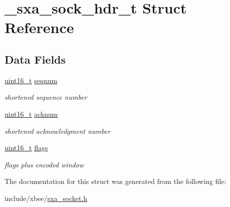 \hypertarget{struct__sxa__sock__hdr__t}{\section{\-\_\-sxa\-\_\-sock\-\_\-hdr\-\_\-t Struct Reference}
\label{struct__sxa__sock__hdr__t}
}
\subsection*{Data Fields}
\begin{DoxyCompactItemize}
\item 
\hypertarget{struct__sxa__sock__hdr__t_a90ee27660869628b83fe9e5fdeaae7b2}{\hyperlink{group__hal_ga5a8b2dc9e45a9ee81a94ef304fb62505}{uint16\-\_\-t} \hyperlink{struct__sxa__sock__hdr__t_a90ee27660869628b83fe9e5fdeaae7b2}{seqnum}}\label{struct__sxa__sock__hdr__t_a90ee27660869628b83fe9e5fdeaae7b2}

\begin{DoxyCompactList}\small\item\em shortened sequence number \end{DoxyCompactList}\item 
\hypertarget{struct__sxa__sock__hdr__t_a0758eb4120471bc74831dafe59b1f5c7}{\hyperlink{group__hal_ga5a8b2dc9e45a9ee81a94ef304fb62505}{uint16\-\_\-t} \hyperlink{struct__sxa__sock__hdr__t_a0758eb4120471bc74831dafe59b1f5c7}{acknum}}\label{struct__sxa__sock__hdr__t_a0758eb4120471bc74831dafe59b1f5c7}

\begin{DoxyCompactList}\small\item\em shortened acknowledgment number \end{DoxyCompactList}\item 
\hypertarget{struct__sxa__sock__hdr__t_a1e87af3c18a2fd36c61faf89949bdc3f}{\hyperlink{group__hal_ga5a8b2dc9e45a9ee81a94ef304fb62505}{uint16\-\_\-t} \hyperlink{struct__sxa__sock__hdr__t_a1e87af3c18a2fd36c61faf89949bdc3f}{flags}}\label{struct__sxa__sock__hdr__t_a1e87af3c18a2fd36c61faf89949bdc3f}

\begin{DoxyCompactList}\small\item\em flags plus encoded window \end{DoxyCompactList}\end{DoxyCompactItemize}


The documentation for this struct was generated from the following file\-:\begin{DoxyCompactItemize}
\item 
include/xbee/\hyperlink{sxa__socket_8h}{sxa\-\_\-socket.\-h}\end{DoxyCompactItemize}
